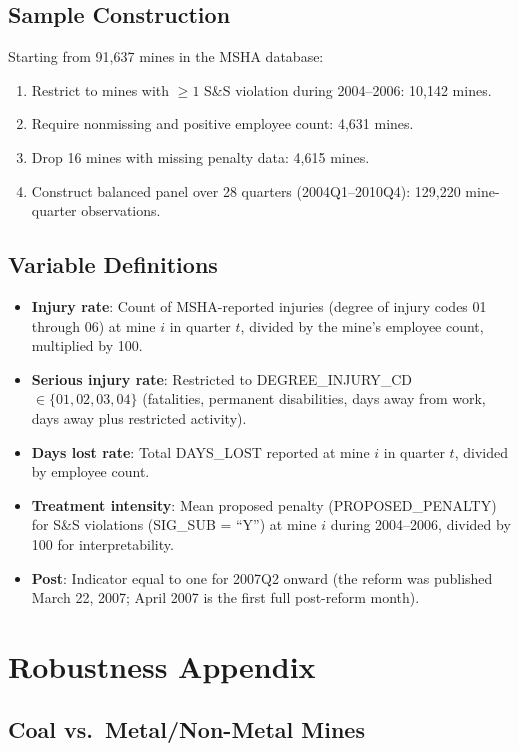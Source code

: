 \documentclass[12pt]{article}
\begin{document}
\subsection{Sample Construction}

Starting from 91,637 mines in the MSHA database:
\begin{enumerate}
\item Restrict to mines with $\geq 1$ S\&S violation during 2004--2006: 10,142 mines.
\item Require nonmissing and positive employee count: 4,631 mines.
\item Drop 16 mines with missing penalty data: 4,615 mines.
\item Construct balanced panel over 28 quarters (2004Q1--2010Q4): 129,220 mine-quarter observations.
\end{enumerate}

\subsection{Variable Definitions}

\begin{itemize}
\item \textbf{Injury rate}: Count of MSHA-reported injuries (degree of injury codes 01 through 06) at mine $i$ in quarter $t$, divided by the mine's employee count, multiplied by 100.
\item \textbf{Serious injury rate}: Restricted to DEGREE\_INJURY\_CD $\in \{01, 02, 03, 04\}$ (fatalities, permanent disabilities, days away from work, days away plus restricted activity).
\item \textbf{Days lost rate}: Total DAYS\_LOST reported at mine $i$ in quarter $t$, divided by employee count.
\item \textbf{Treatment intensity}: Mean proposed penalty (PROPOSED\_PENALTY) for S\&S violations (SIG\_SUB = ``Y'') at mine $i$ during 2004--2006, divided by 100 for interpretability.
\item \textbf{Post}: Indicator equal to one for 2007Q2 onward (the reform was published March 22, 2007; April 2007 is the first full post-reform month).
\end{itemize}


\section{Robustness Appendix}

\subsection{Coal vs.\ Metal/Non-Metal Mines}
\end{document}
